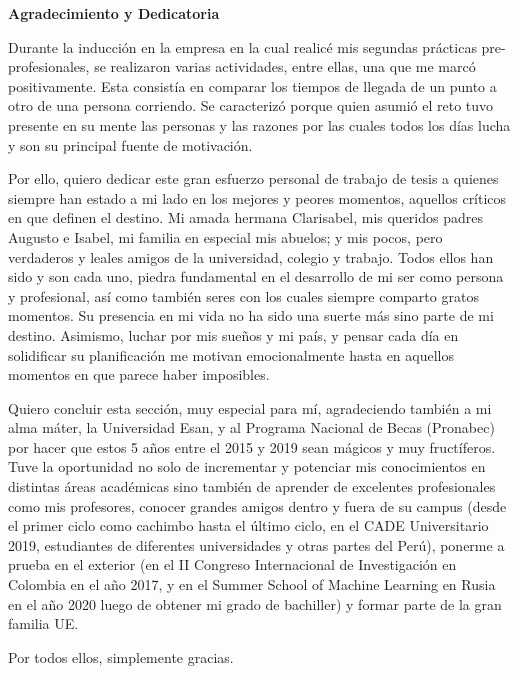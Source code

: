 \begin{center}
	{\large \bfseries  Agradecimiento y Dedicatoria}
\end{center}
\vspace{0.5cm}

Durante la inducción en la empresa en la cual realicé mis segundas prácticas pre-profesionales, se realizaron varias actividades, entre ellas, una que me marcó positivamente. Esta consistía en comparar los tiempos de llegada de un punto a otro de una persona corriendo. Se caracterizó porque quien asumió el reto tuvo presente en su mente las personas y las razones por las cuales todos los días lucha y son su principal fuente de motivación.

Por ello, quiero dedicar este gran esfuerzo personal de trabajo de tesis a quienes siempre han estado a mi lado en los mejores y peores momentos, aquellos críticos en que definen el destino. Mi amada hermana Clarisabel, mis queridos padres Augusto e Isabel, mi familia en especial mis abuelos; y mis pocos, pero verdaderos y leales amigos de la universidad, colegio y trabajo. Todos ellos han sido y son cada uno, piedra fundamental en el desarrollo de mi ser como persona y profesional, así como también seres con los cuales siempre comparto gratos momentos. Su presencia en mi vida no ha sido una suerte más sino parte de mi destino.
Asimismo, luchar por mis sueños y mi país, y pensar cada día en solidificar su planificación me motivan emocionalmente hasta en aquellos momentos en que parece haber imposibles.

Quiero concluir esta sección, muy especial para mí, agradeciendo también a mi alma máter, la Universidad Esan, y al Programa Nacional de Becas (Pronabec) por hacer que estos 5 años entre el 2015 y 2019 sean mágicos y muy fructíferos. Tuve la oportunidad no solo de incrementar y potenciar mis conocimientos en distintas áreas académicas sino también de aprender de excelentes profesionales como mis profesores, conocer grandes amigos dentro y fuera de su campus (desde el primer ciclo como cachimbo hasta el último ciclo, en el CADE Universitario 2019, estudiantes de diferentes universidades y otras partes del Perú), ponerme a prueba en el exterior (en el II Congreso Internacional de Investigación en Colombia en el año 2017, y en el Summer School of Machine Learning en Rusia en el año 2020 luego de obtener mi grado de bachiller) y formar parte de la gran familia UE.

Por todos ellos, simplemente gracias.
\newline

